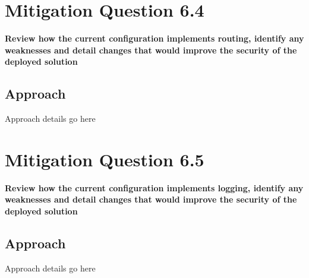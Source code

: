 \section{Mitigation Question 6.4}
\textbf{Review how the current configuration implements routing, identify any
weaknesses and detail changes that would improve the security of the deployed
solution}
\subsection{Approach}
Approach details go here

\section{Mitigation Question 6.5}
\textbf{Review how the current configuration implements logging, identify any
weaknesses and detail changes that would improve the security of the deployed
solution}
\subsection{Approach}
Approach details go here
